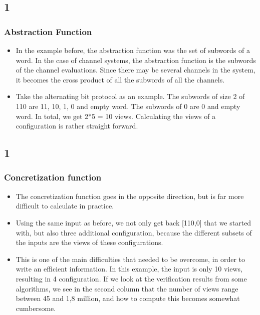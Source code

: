\documentclass[handout]{beamer}
\begin{document}
\begin{footnotesize}
\subsection*{1}
\begin{frame}
  \frametitle{Abstraction Function}
  \begin{itemize}
  \item
  In the example before, the abstraction function was the set of subwords of a word. In the case of channel systems, the abstraction function is the subwords of the channel evaluations. Since there may be several channels in the system, it becomes the cross product of all the subwords of all the channels.
\item
  Take the alternating bit protocol as an example. The subwords of size 2 of 110 are 11, 10, 1, 0 and empty word. The subwords of 0 are 0 and empty word. In total, we get 2*5 = 10 views. Calculating the views of a configuration is rather straight forward.

    \end{itemize}
\end{frame}

\subsection*{1}
\begin{frame}
  \frametitle{Concretization function}
  \begin{itemize}
  \item
  The concretization function goes in the opposite direction, but is far more difficult to calculate in practice.

  \item
  Using the same input as before, we not only get back [110,0] that we started with, but also three additional configuration, because the different subsets of the inputs are the views of these configurations.
\item
  This is one of the main difficulties that needed to be overcome, in order to write an efficient information. In this example, the input is only 10 views, resulting in 4 configuration. If we look at the verification results from some algorithms, we see in the second column that the number of views range between 45 and 1,8 million, and how to compute this becomes somewhat cumbersome.
  \end{itemize}
\end{frame}



\end{footnotesize}
\end{document}
